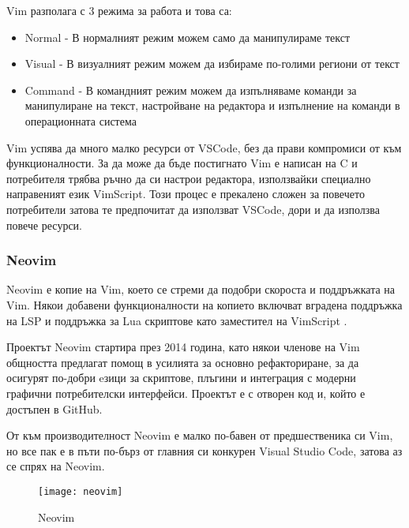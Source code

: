 Vim разполага с 3 режима за работа и това са:
\begin{itemize}
\item Normal - В нормалният режим можем само да манипулираме текст
\item Visual - В визуалният режим можем да избираме по-голими региони от текст
\item Command - В командният режим можем да изпълняваме команди за манипулиране
на текст, настройване на редактора и изпълнение на команди в операционната
система \end{itemize}

Vim успява да много малко ресурси от VSCode, без да прави компромиси от към
функционалности. За да може да бъде постигнато Vim е написан на C и потребителя
трябва ръчно да си настрои редактора, използвайки специално направеният език
VimScript. Този процес е прекалено сложен за повечето потребители затова те
предпочитат да използват VSCode, дори и да използва повече ресурси.

\subsubsection{Neovim}
Neovim е копие на Vim, което се стреми да подобри скороста и поддръжката на
Vim. Някои добавени функционалности на копието включват вградена поддръжка на
LSP и поддръжка за Lua скриптове като заместител на VimScript \cite{neovim_wikipedia}.

Проектът Neovim стартира през 2014 година, като някои членове на Vim общността
предлагат помощ в усилията за основно рефакториране, за да осигурят по-добри
eзици за скриптове, плъгини и интеграция с модерни графични потребителски интерфейси.
Проектът е с отворен код и, който е достъпен в GitHub. \cite{neovim_github}

От към производителност Neovim е малко по-бавен от предшественика си Vim, но
все пак е в пъти по-бърз от главния си конкурен Visual Studio Code, затова аз
се спрях на Neovim.

\begin{figure}[!htb]
  \texttt{[image: neovim]}
  \centering
  \caption{Neovim}
  \label{fig:neovim}
\end{figure}

